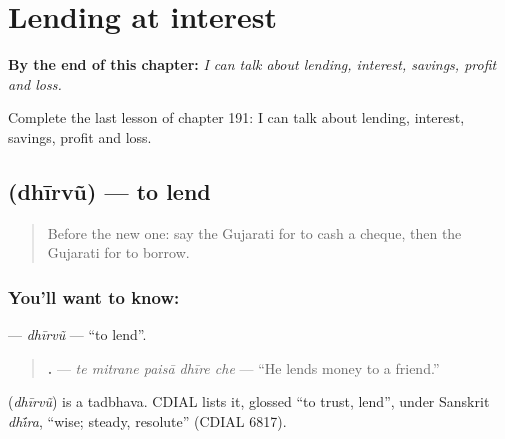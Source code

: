 
\chapter{Lending at interest}
\label{ch:gu-lending-at-interest}

\begin{chapteropening}
\textbf{By the end of this chapter:} \emph{I can talk about lending, interest, savings, profit and loss.}

Complete the last lesson of chapter 191: I can talk about lending, interest, savings, profit and loss.
\end{chapteropening}

\section[\texorpdfstring{\gu{ધીરવું} (dhīrvũ)}{ધીરવું (dhīrvũ)}]{ (dhīrvũ) — to lend}

\label{lesson:GU-C191-dhirvu}



\begin{quote}
Before the new one: say the Gujarati for to cash a cheque, then the Gujarati for to borrow.
\end{quote}

\subsection*{You'll want to know: }
\textbf{} — \emph{dhīrvũ} — \textquotedblleft{}to lend\textquotedblright{}.

\begin{quote}
\textbf{    .} — \emph{te mitrane paisā dhīre che} — \textquotedblleft{}He lends money to a friend.\textquotedblright{}
\end{quote}

\begin{cousinweb}
\textbf{} (\emph{dhīrvũ}) is a tadbhava. CDIAL lists it, glossed \textquotedblleft{}to trust, lend\textquotedblright{}, under Sanskrit \emph{dh\'{\={\i}}ra}, \textquotedblleft{}wise; steady, resolute\textquotedblright{} (CDIAL 6817).
\end{cousinweb}

